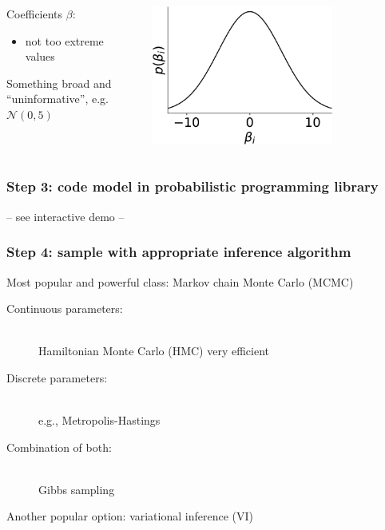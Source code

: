 \documentclass[t,aspectratio=169]{beamer}
\begin{document}
\begin{frame}
\begin{columns}
\begin{column}[T]{0.3\textwidth}
    \end{column}
  \end{columns}
  \begin{columns}
    \begin{column}{0.65\textwidth}
      Coefficients $\beta$:\\
      \begin{itemize}
      \item not too extreme values \shrug
      \end{itemize}
      Something broad and ``uninformative'', e.g. $\mathcal{N}(0, 5)$
    \end{column}
    \begin{column}[T]{0.3\textwidth}
      \includegraphics[width=0.7\textwidth]{images/widenormal-crop}
    \end{column}
  \end{columns}
\end{frame}

\begin{frame}
  \frametitle{Step 3: code model in probabilistic programming library}
  \centering
  \vfill
  \Huge-- see interactive demo --
  \vfill
\end{frame}

\begin{frame}
  \frametitle{Step 4: sample with appropriate inference algorithm}
  Most popular and powerful class: Markov chain Monte Carlo (MCMC)
  \begin{description}
  \item[Continuous parameters:] \hfill \\
    Hamiltonian Monte Carlo (HMC) very efficient
  \item[Discrete parameters:] \hfill \\
    e.g., Metropolis-Hastings
  \item[Combination of both:]  \hfill \\
    Gibbs sampling
  \end{description}
  Another popular option: variational inference (VI)
\end{frame}
\end{document}
